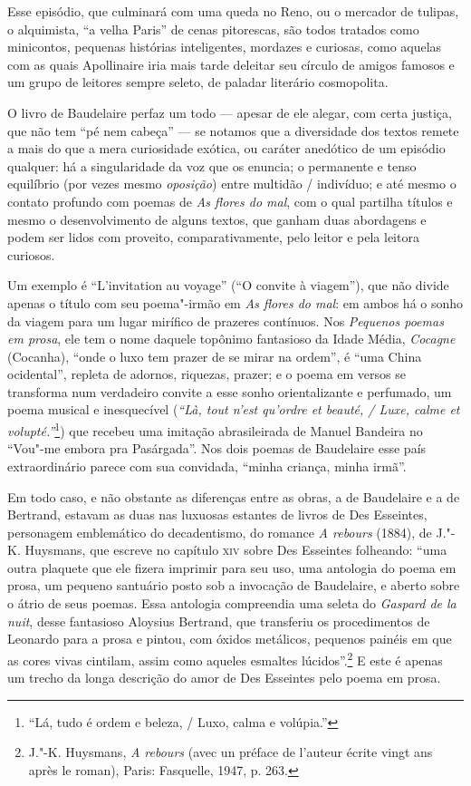 Esse episódio, que culminará com uma queda no Reno, ou o mercador de tulipas,
o alquimista, “a velha Paris” de cenas pitorescas, são todos
tratados como minicontos, pequenas histórias inteligentes, mordazes
e curiosas, como aquelas com as quais Apollinaire iria mais tarde
deleitar seu círculo de amigos famosos e um grupo de leitores sempre
seleto, de paladar literário cosmopolita.

O livro de Baudelaire perfaz um todo --- apesar de ele alegar, com certa
justiça, que não tem “pé nem cabeça” --- se notamos que a diversidade dos
textos remete a mais do que a mera curiosidade exótica, ou caráter
anedótico de um episódio qualquer: há a singularidade da voz que os
enuncia; o permanente e tenso equilíbrio (por vezes mesmo
\textit{oposição}) entre multidão / indivíduo; e até mesmo o contato
profundo com poemas de \textit{As flores do mal}, com o qual partilha
títulos e mesmo o desenvolvimento de alguns textos, que ganham duas
abordagens e podem ser lidos com proveito, comparativamente, pelo
leitor e pela leitora curiosos.

Um exemplo é “L’invitation au voyage” (“O convite à viagem”), que não
divide apenas o título com seu poema"-irmão em \textit{As flores do
mal}: em ambos há o sonho da viagem para um lugar mirífico de prazeres
contínuos. Nos \textit{Pequenos poemas em prosa}, ele tem o nome daquele
topônimo fantasioso da Idade Média, \textit{Cocagne} (Cocanha), “onde
o luxo tem prazer de se mirar na ordem”, é “uma China ocidental”,
repleta de adornos, riquezas, prazer; e o poema em versos se transforma
num verdadeiro convite a esse sonho orientalizante e perfumado, um
poema musical e inesquecível (\textit{“Là, tout n’est qu’ordre et
beauté, / Luxe, calme et volupté.”}\footnote{ “Lá, tudo é ordem e beleza, / 
Luxo, calma e volúpia.”}) que recebeu uma imitação abrasileirada de
Manuel Bandeira no “Vou"-me embora pra Pasárgada”. Nos dois poemas de
Baudelaire esse país extraordinário parece com sua convidada, “minha
criança, minha irmã”.

Em todo caso, e não obstante as diferenças entre as obras, a de
Baudelaire e a de Bertrand, estavam as duas nas luxuosas estantes de
livros de Des Esseintes, personagem emblemático do decadentismo, do
romance \textit{A rebours} (1884), de J."-K. Huysmans, que escreve no
capítulo \textsc{xiv} sobre Des Esseintes folheando: “uma outra plaquete que ele
fizera imprimir para seu uso, uma antologia do poema em prosa, um
pequeno santuário posto sob a invocação de Baudelaire, e aberto sobre o
átrio de seus poemas. Essa antologia compreendia uma seleta do
\textit{Gaspard de la nuit}, desse fantasioso Aloysius Bertrand, que
transferiu os procedimentos de Leonardo para a prosa e pintou, com
óxidos metálicos, pequenos painéis em que as cores vivas cintilam,
assim como aqueles esmaltes lúcidos”.\footnote{ J."-K. Huysmans,  \textit{A
rebours} (avec un préface de l’auteur écrite vingt ans après le roman),
Paris: Fasquelle, 1947, p. 263.}  E este é apenas um trecho da
longa descrição do amor de Des Esseintes pelo poema em prosa.

